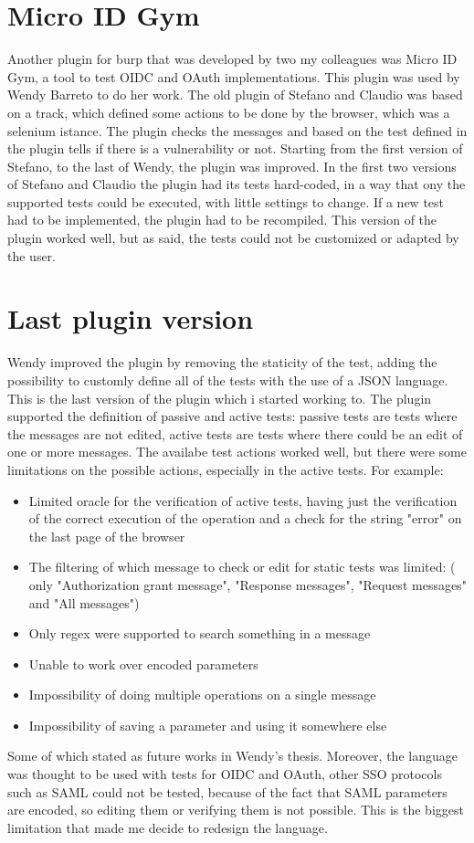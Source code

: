\section{Micro ID Gym}
Another plugin for burp that was developed by two my colleagues was Micro ID Gym, a tool to test OIDC and OAuth implementations. This plugin was used by Wendy Barreto to do her work.
The old plugin of Stefano and Claudio was based on a track, which defined some actions to be done by the browser, which was a selenium istance. The plugin checks the messages and based on the test defined in the plugin tells if there is a vulnerability or not.
Starting from the first version of Stefano, to the last of Wendy, the plugin was improved. In the first two versions of Stefano and Claudio the plugin had its tests hard-coded, in a way that ony the supported tests could be executed, with little settings to change. If a new test had to be implemented, the plugin had to be recompiled. This version of the plugin worked well, but as said, the tests could not be customized or adapted by the user.

\section{Last plugin version}
Wendy improved the plugin by removing the staticity of the test, adding the possibility to customly define all of the tests with the use of a JSON language. \\
This is the last version of the plugin which i started working to. The plugin supported the definition of passive and active tests: passive tests are tests where the messages are not edited, active tests are tests where there could be an edit of one or more messages. The availabe test actions worked well, but there were some limitations on the possible actions, especially in the active tests. For example:
\begin{itemize}
    \item Limited oracle for the verification of active tests, having just the verification of the correct execution of the operation and a check for the string "error" on the last page of the browser
    \item The filtering of which message to check or edit for static tests was limited: ( only "Authorization grant message", "Response messages", "Request messages" and "All messages")
    \item Only regex were supported to search something in a message
    \item Unable to work over encoded parameters
    \item Impossibility of doing multiple operations on a single message
    \item Impossibility of saving a parameter and using it somewhere else
\end{itemize}
Some of which stated as future works in Wendy's thesis.
Moreover, the language was thought to be used with tests for OIDC and OAuth, other SSO protocols such as SAML could not be tested, because of the fact that SAML parameters are encoded, so editing them or verifying them is not possible. This is the biggest limitation that made me decide to redesign the language.

